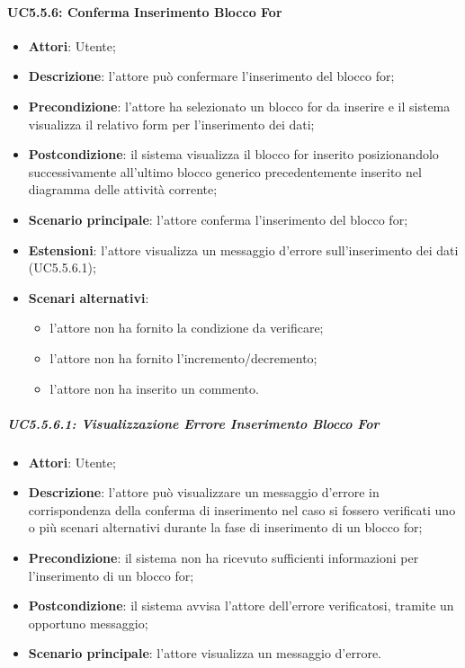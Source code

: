 \begin{itemize}
\begin{itemize}
\begin{itemize}
\begin{itemize}
\paragraph{UC5.5.6: Conferma Inserimento Blocco For}
\label{UC5.5.6}
\begin{itemize}
	\item \textbf{Attori}: Utente;
	\item \textbf{Descrizione}: l'attore può confermare l'inserimento del blocco for;
	\item \textbf{Precondizione}: l'attore ha selezionato un blocco for da inserire e il sistema visualizza il relativo form per l'inserimento dei dati;
	\item \textbf{Postcondizione}: il sistema visualizza il blocco for inserito posizionandolo successivamente all'ultimo blocco generico precedentemente inserito nel diagramma delle attività corrente;
	\item \textbf{Scenario principale}: l'attore conferma l'inserimento del blocco for;
	\item \textbf{Estensioni}: l'attore visualizza un messaggio d'errore sull'inserimento dei dati (UC5.5.6.1);
	\item \textbf{Scenari alternativi}:
	\begin{itemize}
		\item l'attore non ha fornito la condizione da verificare;
		\item l'attore non ha fornito l'incremento/decremento;
		\item l'attore non ha inserito un commento.
	\end{itemize}
\end{itemize}

\subparagraph{UC5.5.6.1: Visualizzazione Errore Inserimento Blocco For}
\label{UC5.5.6.1}
\begin{itemize}
	\item \textbf{Attori}: Utente;
	\item \textbf{Descrizione}: l'attore può visualizzare un messaggio d'errore in corrispondenza della conferma di inserimento nel caso si fossero verificati uno o più scenari alternativi durante la fase di inserimento di un blocco for;
	\item \textbf{Precondizione}: il sistema non ha ricevuto sufficienti informazioni per l'inserimento di un blocco for;
	\item \textbf{Postcondizione}: il sistema avvisa l'attore dell'errore verificatosi, tramite un opportuno messaggio;
	\item \textbf{Scenario principale}: l'attore visualizza un messaggio d'errore.
\end{itemize}


\end{itemize}
\end{itemize}
\end{itemize}
\end{itemize}
